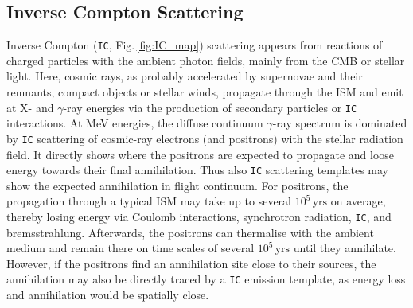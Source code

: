 \documentclass[doublespace,nopageskip]{VTthesis} %
\newcommand{\mrm}[1]{\mathrm{#1}}
\begin{document}
\begin{appendices}
	
	\subsection{Inverse Compton Scattering}
	
	Inverse Compton (\texttt{IC}, Fig.\,\ref{fig:IC_map}) scattering appears from reactions of charged particles with the ambient photon fields, mainly from the CMB or stellar light.
	Here, cosmic rays, as probably accelerated by supernovae and their remnants, compact objects or stellar winds, propagate through the ISM and emit at X- and $\gamma$-ray energies via the production of secondary particles or \texttt{IC} interactions.
	At MeV energies, the diffuse continuum $\gamma$-ray spectrum is dominated by \texttt{IC} scattering of cosmic-ray electrons (and positrons) with the stellar radiation field.
	It directly shows where the positrons are expected to propagate and loose energy towards their final annihilation.
	Thus also \texttt{IC} scattering templates may show the expected annihilation in flight continuum.
	For positrons, the propagation through a typical ISM may take up to several $10^5\,\mrm{yrs}$ on average, thereby losing energy via Coulomb interactions, synchrotron radiation, \texttt{IC}, and bremsstrahlung.
	Afterwards, the positrons can thermalise with the ambient medium and remain there on time scales of several $10^{5}\,\mrm{yrs}$ until they annihilate.
	However, if the positrons find an annihilation site close to their sources, the annihilation may also be directly traced by a \texttt{IC} emission template, as energy loss and annihilation would be spatially close.
	
	

\end{appendices}
\end{document}
